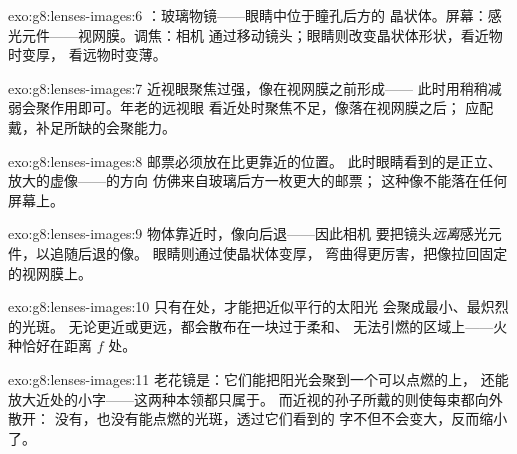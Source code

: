 \begin{solution}{exo:g8:lenses-images:6}
：玻璃物镜——眼睛中位于瞳孔后方的
晶状体。屏幕：感光元件——视网膜。调焦：相机
通过移动镜头；眼睛则改变晶状体形状，看近物时变厚，
看远物时变薄。
\end{solution}

\begin{solution}{exo:g8:lenses-images:7}
近视眼聚焦过强，像在视网膜之前形成——
此时用稍稍减弱会聚作用即可。年老的远视眼
看近处时聚焦不足，像落在视网膜之后；
应配戴，补足所缺的会聚能力。
\end{solution}

\begin{solution}{exo:g8:lenses-images:8}
邮票必须放在比更靠近的位置。
此时眼睛看到的是正立、放大的虚像——的方向
仿佛来自玻璃后方一枚更大的邮票；
这种像不能落在任何屏幕上。
\end{solution}

\begin{solution}{exo:g8:lenses-images:9}
物体靠近时，像向后退——因此相机
要把镜头\emph{远离}感光元件，以追随后退的像。
眼睛则通过使晶状体变厚，
弯曲得更厉害，把像拉回固定的视网膜上。
\end{solution}

\begin{solution}{exo:g8:lenses-images:10}
只有在处，才能把近似平行的太阳光
会聚成最小、最炽烈的光斑。
无论更近或更远，都会散布在一块过于柔和、
无法引燃的区域上——火种恰好在距离 $f$ 处。
\end{solution}

\begin{solution}{exo:g8:lenses-images:11}
老花镜是：它们能把阳光会聚到一个可以点燃的上，
还能放大近处的小字——这两种本领都只属于。
而近视的孙子所戴的则使每束都向外散开：
没有，也没有能点燃的光斑，透过它们看到的
字不但不会变大，反而缩小了。
\end{solution}

